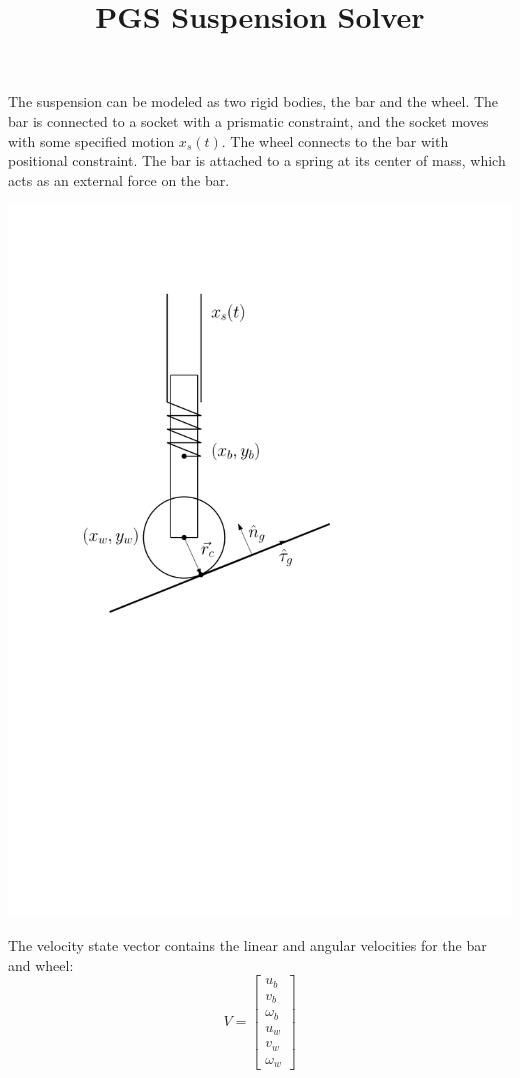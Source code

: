 \documentclass[9pt]{article}
\title{PGS Suspension Solver}
\begin{document}
\maketitle

The suspension can be modeled as two rigid bodies, the bar and the wheel. The bar is connected to a socket with a prismatic constraint, and the socket moves with some specified motion $x_s(t)$. The wheel connects to the bar with positional constraint. The bar is attached to a spring at its center of mass, which acts as an external force on the bar.

\begin{center}
\includegraphics[scale=0.5]{diagram.pdf}
\end{center}

The velocity state vector contains the linear and angular velocities for the bar and wheel:
\[
V = 
\left[
\begin{array}{c}
u_b \\
v_b \\
\omega_b \\
u_w \\
v_w \\
\omega_w
\end{array} 
\right]
\]
\end{document}
